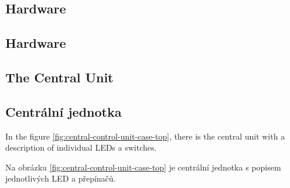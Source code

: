 \begin{English}
\section{Hardware}
\end{English}

\begin{Czech}
\section{Hardware}
\end{Czech}

\begin{English}
\subsection{The Central Unit}
\end{English}

\begin{Czech}
\subsection{Centrální jednotka}
\end{Czech}


\begin{English}
In the figure \ref{fig:central-control-unit-case-top}, there is the central unit with a description of individual LEDs a switches.
\end{English}

\begin{Czech}
Na obrázku \ref{fig:central-control-unit-case-top} je centrální jednotka s popisem jednotlivých LED a přepínačů.
\end{Czech}



